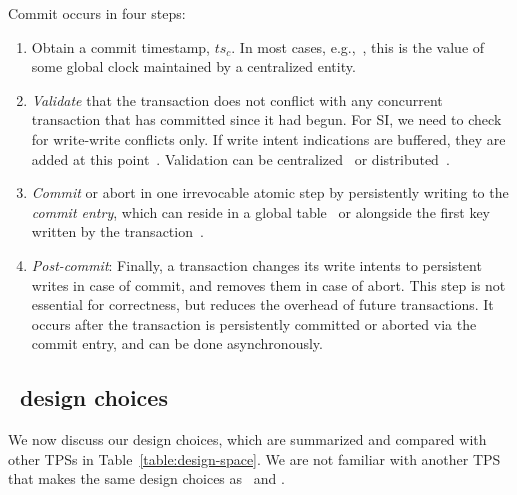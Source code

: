   Commit occurs in four steps:
  \begin{enumerate}
    \setlength{\itemsep}{0pt}
    \setlength{\parskip}{0pt}
    \setlength{\parsep}{2pt}  
  \item
  Obtain a commit timestamp, $ts_c$. 
  In most cases, e.g.,~\cite{Percolator2010,OmidICDE2014,Omid2017,tephra}, 
  this is the value of some global clock maintained by a centralized entity. 
  \item \emph{Validate} that the transaction does not conflict with any concurrent transaction that has committed since it 
had begun.  For SI, we need to check for write-write conflicts only. 
If write intent indications are buffered, they are added at this point~\cite{Percolator2010}.
Validation can be centralized~\cite{OmidICDE2014,Omid2017,tephra} or distributed~\cite{Percolator2010,cockroach}. 


\item \emph{Commit} or abort in one  irrevocable atomic step by persistently writing to the \emph{commit entry}, 
  which can reside in a global table~\cite{Omid2017,cockroach} or alongside the first  key written by 
  the transaction~\cite{Percolator2010}.  
  
 \item \emph{Post-commit}: 
  Finally, a transaction changes its write intents to
  persistent writes in case of commit, and removes them in case of abort. This
  step is not essential for correctness, but reduces the overhead of future transactions. It
  occurs after the transaction is persistently committed or aborted via the commit entry, 
  and can be done asynchronously.
 \end{enumerate}
 

\subsection{\sysll\ design choices}
\label{ssec:ll-txns}

We now discuss our design choices, which are summarized and compared with other TPSs in  Table~\ref{table:design-space}. 
We are not familiar with another TPS that makes the same design choices as \sysll\ and \sys. 


